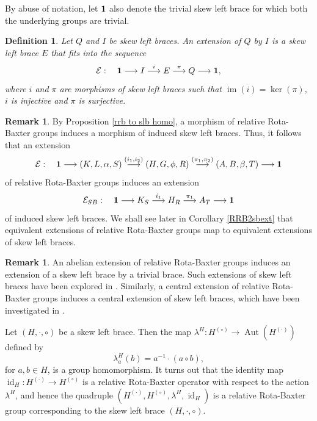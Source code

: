 \documentclass[11pt]{amsart}
\theoremstyle{thrm}
\theoremstyle{plain}
\newtheorem{defn}[thm]{Definition}
\theoremstyle{definition}
\newtheorem{remark}[equation]{Remark}
\newcommand{\im}{\operatorname{im} }
\newcommand{\Id}{\operatorname{id}}
\numberwithin{equation}{section}
\begin{document}
By abuse of notation, let ${\bf 1}$ also denote the trivial skew left brace for which both the underlying groups are trivial.


\begin{defn}
Let $Q$ and $I$ be skew left braces. An extension of $Q$ by $I$ is a skew left brace $E$ that fits into the sequence
$$\mathcal{E} : \quad  {\bf 1}\longrightarrow I \stackrel{i}{\longrightarrow}  E \stackrel{\pi}{\longrightarrow} Q \longrightarrow {\bf 1},$$ 
where $i$ and $\pi$ are morphisms of skew left braces such that $\im(i)=\ker(\pi)$, $i$ is injective and $\pi$ is surjective.
\end{defn}

\begin{remark}\label{extsb}
By Proposition \ref{rrb to slb homo}, a morphism of relative Rota-Baxter groups induces a morphism of induced skew left braces. Thus, it follows that an extension 
$$\mathcal{E}: \quad {\bf 1} \longrightarrow (K,L, \alpha,S ) \stackrel{(i_1, i_2)}{\longrightarrow}  (H,G, \phi, R) \stackrel{(\pi_1, \pi_2)}{\longrightarrow} (A,B, \beta, T) \longrightarrow {\bf 1}$$ 
of relative Rota-Baxter groups induces an extension
$$\mathcal{E}_{SB}: \quad  {\bf 1} \longrightarrow K_{S} \stackrel{i_1}{\longrightarrow}  H_{R} \stackrel{\pi_1}{\longrightarrow} A_{T} \longrightarrow {\bf 1}$$
of induced skew left braces. We shall see later in Corollary \ref{RRB2sbext} that equivalent extensions of relative Rota-Baxter groups map to equivalent extensions of skew left braces.
\end{remark}


\begin{remark}\label{remark1}
An abelian extension of relative Rota-Baxter groups induces an extension of a skew left brace by  a trivial brace. Such extensions of skew left braces have been explored in \cite{DB18, NMY1}. Similarly, a central extension of relative Rota-Baxter groups induces a central extension of skew left braces, which have been investigated in \cite{CCS3, LV16}.
\end{remark}

Let $(H,\cdot ,\circ)$ be a skew left brace. Then the map $\lambda^H: H^{(\circ)} \longrightarrow \operatorname{Aut}(H^{(\cdot)})$ defined by 
$$\lambda^H_a(b) = a^{-1} \cdot (a \circ b),$$ 
for $a,b \in H$, is a group homomorphism. It turns out that the identity map $\Id_H: H^{(\cdot)} \longrightarrow H^{(\circ)}$ is a relative Rota-Baxter operator with respect to the action $\lambda^H$, and hence  the quadruple $(H^{(\cdot)}, H^{(\circ)}, \lambda^H, \Id_H)$ is a relative Rota-Baxter group corresponding to the skew left brace $(H,\cdot ,\circ)$.
\end{document}
